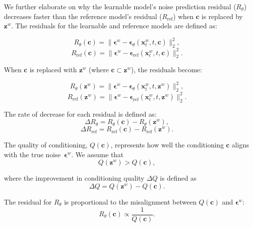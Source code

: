 




We further elaborate on why the learnable model's noise prediction residual ($ R_\theta $) decreases faster than the reference model's residual ($ R_{\text{ref}} $) when $ \mathbf{c} $ is replaced by $ \mathbf{z}^w $. The residuals for the learnable and reference models are defined as:

$$
R_\theta(\mathbf{c}) = \| \boldsymbol{\epsilon}^w - \boldsymbol{\epsilon}_\theta(\mathbf{x}_t^w, t, \mathbf{c}) \|_2^2,
$$
$$
R_{\text{ref}}(\mathbf{c}) = \| \boldsymbol{\epsilon}^w - \boldsymbol{\epsilon}_{\text{ref}}(\mathbf{x}_t^w, t, \mathbf{c}) \|_2^2.
$$

When $ \mathbf{c} $ is replaced with $ \mathbf{z}^w $ (where $ \mathbf{c} \subset \mathbf{z}^w $), the residuals become:

$$
R_\theta(\mathbf{z}^w) = \| \boldsymbol{\epsilon}^w - \boldsymbol{\epsilon}_\theta(\mathbf{x}_t^w, t, \mathbf{z}^w) \|_2^2,
$$
$$
R_{\text{ref}}(\mathbf{z}^w) = \| \boldsymbol{\epsilon}^w - \boldsymbol{\epsilon}_{\text{ref}}(\mathbf{x}_t^w, t, \mathbf{z}^w) \|_2^2.
$$

The rate of decrease for each residual is defined as:
$$
\Delta R_\theta = R_\theta(\mathbf{c}) - R_\theta(\mathbf{z}^w),
$$
$$
\Delta R_{\text{ref}} = R_{\text{ref}}(\mathbf{c}) - R_{\text{ref}}(\mathbf{z}^w).
$$

The quality of conditioning, $ Q(\mathbf{c}) $, represents how well the conditioning $ \mathbf{c} $ aligns with the true noise~$ \boldsymbol{\epsilon}^w $. We assume that
$$
Q(\mathbf{z}^w) > Q(\mathbf{c}),
$$

where the improvement in conditioning quality $ \Delta Q $ is defined as
$$
\Delta Q = Q(\mathbf{z}^w) - Q(\mathbf{c}).
$$


The residual for $ R_\theta $ is proportional to the misalignment between $ Q(\mathbf{c}) $ and $ \boldsymbol{\epsilon}^w $:
 $$
 R_\theta(\mathbf{c}) \propto \frac{1}{Q(\mathbf{c})}.
 $$

